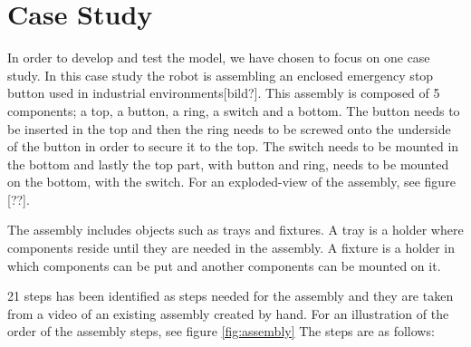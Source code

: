 \chapter{Case Study}\label{cha:assembly}
In order to develop and test the model, we have chosen to focus on one case study. In this case study the robot is assembling an enclosed emergency stop button used in industrial environments[bild?]. This assembly is composed of 5 components; a top, a button, a ring, a switch and a bottom. The button needs to be inserted in the top and then the ring needs to be screwed onto the underside of the button in order to secure it to the top. The switch needs to be mounted in the bottom and lastly the top part, with button and ring, needs to be mounted on the bottom, with the switch. For an exploded-view of the assembly, see figure [??].

The assembly includes objects such as trays and fixtures. A tray is a holder where components reside until they are needed in the assembly. A fixture is a holder in which components can be put and another components can be mounted on it.

21 steps has been identified as steps needed for the assembly and they are taken from a video of an existing assembly created by hand. For an illustration of the order of the assembly steps, see figure \ref{fig:assembly} The steps are as follows:

